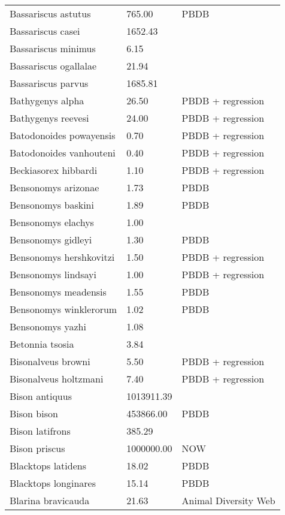 \begin{longtable}{p{} p{} p{}}
    Bassariscus astutus & 765.00 & PBDB \\ 
    Bassariscus casei & 1652.43 & \cite{Tomiya2013} \\ 
    Bassariscus minimus & 6.15 & \cite{Robinson1966} \\ 
    Bassariscus ogallalae & 21.94 & \cite{Gidley1920} \\ 
    Bassariscus parvus & 1685.81 & \cite{Tomiya2013} \\ 
    Bathygenys alpha & 26.50 & PBDB + regression \\ 
    Bathygenys reevesi & 24.00 & PBDB + regression \\ 
    Batodonoides powayensis & 0.70 & PBDB + regression \\ 
    Batodonoides vanhouteni & 0.40 & PBDB + regression \\ 
    Beckiasorex hibbardi & 1.10 & PBDB + regression \\ 
    Bensonomys arizonae & 1.73 & PBDB \\ 
    Bensonomys baskini & 1.89 & PBDB \\ 
    Bensonomys elachys & 1.00 & \cite{Kirk2011} \\ 
    Bensonomys gidleyi & 1.30 & PBDB \\ 
    Bensonomys hershkovitzi & 1.50 & PBDB + regression \\ 
    Bensonomys lindsayi & 1.00 & PBDB + regression \\ 
    Bensonomys meadensis & 1.55 & PBDB \\ 
    Bensonomys winklerorum & 1.02 & PBDB \\ 
    Bensonomys yazhi & 1.08 & \cite{Rose2013a} \\ 
    Betonnia tsosia & 3.84 & \cite{Clemens2005} \\ 
    Bisonalveus browni & 5.50 & PBDB + regression \\ 
    Bisonalveus holtzmani & 7.40 & PBDB + regression \\ 
    Bison antiquus & 1013911.39 & \cite{Brook2004a} \\ 
    Bison bison & 453866.00 & PBDB \\ 
    Bison latifrons & 385.29 & \cite{Smith2004} \\ 
    Bison priscus & 1000000.00 & NOW \\ 
    Blacktops latidens & 18.02 & PBDB \\ 
    Blacktops longinares & 15.14 & PBDB \\ 
    Blarina bravicauda & 21.63 & Animal Diversity Web \\ 

\end{longtable}
